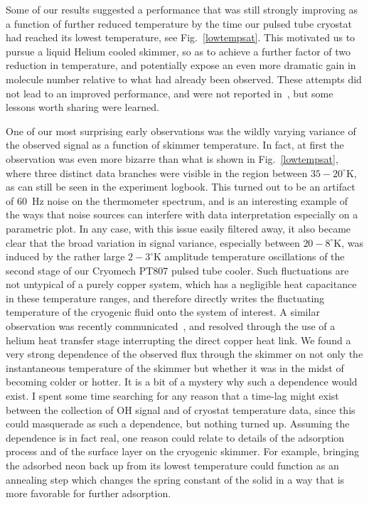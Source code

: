 Some of our results suggested a performance that was still strongly improving as a function of further reduced temperature by the time our pulsed tube cryostat had reached its lowest temperature, see Fig.~\ref{lowtempsat}.
This motivated us to pursue a liquid Helium cooled skimmer, so as to achieve a further factor of two reduction in temperature, and potentially expose an even more dramatic gain in molecule number relative to what had already been observed.
These attempts did not lead to an improved performance, and were not reported in~\cite{Wu2018}, but some lessons worth sharing were learned.


One of our most surprising early observations was the wildly varying variance of the observed signal as a function of skimmer temperature. 
In fact, at first the observation was even more bizarre than what is shown in Fig.~\ref{lowtempsat}, where three distinct data branches were visible in the region between $35-20^\circ$K, as can still be seen in the experiment logbook.
This turned out to be an artifact of $60$~Hz noise on the thermometer spectrum, and is an interesting example of the ways that noise sources can interfere with data interpretation especially on a parametric plot.
In any case, with this issue easily filtered away, it also became clear that the broad variation in signal variance, especially between $20-8^\circ$K, was induced by the rather large $2-3^\circ$K amplitude temperature oscillations of the second stage of our Cryomech PT807 pulsed tube cooler.
Such fluctuations are not untypical of a purely copper system, which has a negligible heat capacitance in these temperature ranges, and therefore directly writes the fluctuating temperature of the cryogenic fluid onto the system of interest.
A similar observation was recently communicated~\cite{Lancaster2019}, and resolved through the use of a helium heat transfer stage interrupting the direct copper heat link.
We found a very strong dependence of the observed flux through the skimmer on not only the instantaneous temperature of the skimmer but whether it was in the midst of becoming colder or hotter.
It is a bit of a mystery why such a dependence would exist.
I spent some time searching for any reason that a time-lag might exist between the collection of OH signal and of cryostat temperature data, since this could masquerade as such a dependence, but nothing turned up.
Assuming the dependence is in fact real, one reason could relate to details of the adsorption process and of the surface layer on the cryogenic skimmer.
For example, bringing the adsorbed neon back up from its lowest temperature could function as an annealing step which changes the spring constant of the solid in a way that is more favorable for further adsorption.

